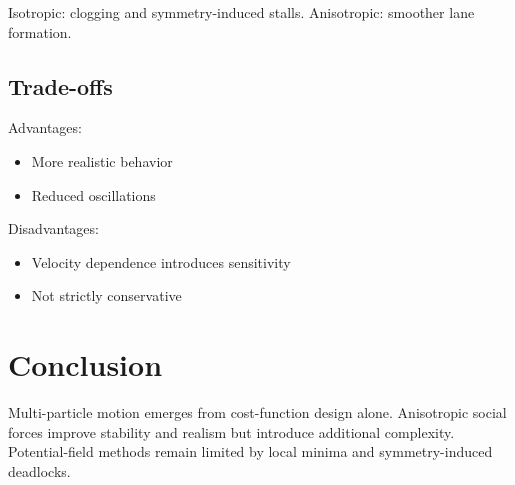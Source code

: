 \documentclass[11pt]{article}
\begin{document}
Isotropic: clogging and symmetry-induced stalls.
Anisotropic: smoother lane formation.

\subsection{Trade-offs}

Advantages:
\begin{itemize}
\item More realistic behavior
\item Reduced oscillations
\end{itemize}

Disadvantages:
\begin{itemize}
\item Velocity dependence introduces sensitivity
\item Not strictly conservative
\end{itemize}

\section{Conclusion}

Multi-particle motion emerges from cost-function design alone.
Anisotropic social forces improve stability and realism but introduce additional complexity.
Potential-field methods remain limited by local minima and symmetry-induced deadlocks.
\end{document}

